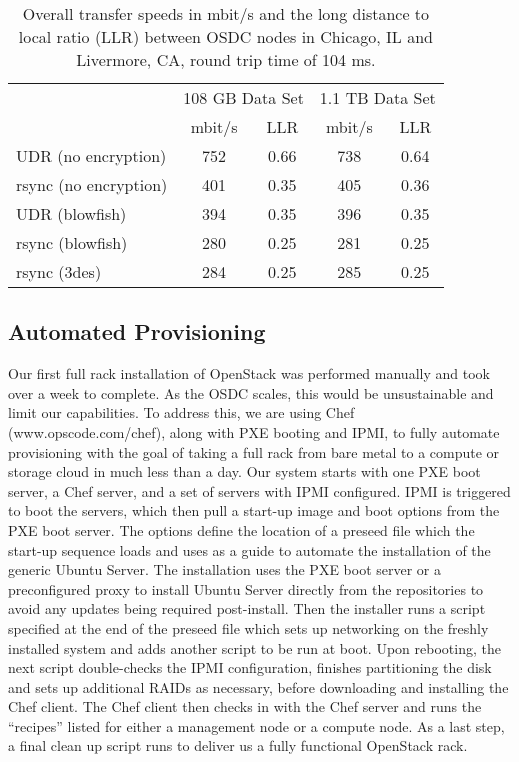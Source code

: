 \documentclass[11pt,twocolumn]{article}
\begin{document}
\begin{table*}[!ht]\renewcommand{\arraystretch}{1.1}
\centering
\begin{tabular}{l | c c c c |}
  \cline{2-5}
  & \multicolumn{2}{|c|}{108 GB Data Set} & \multicolumn{2}{c|}{1.1 TB Data Set} \\ 
  \cline{2-5}
  & mbit/s & LLR & mbit/s & LLR\\ \hline
  \multicolumn{1}{|l|}{UDR (no encryption)} & 752 & 0.66 & 738 & 0.64\\
  \multicolumn{1}{|l|}{rsync (no encryption)} & 401 & 0.35 & 405 & 0.36\\ \hline
  \multicolumn{1}{|l|}{UDR (blowfish)} & 394 & 0.35 & 396 & 0.35 \\ 
  \multicolumn{1}{|l|}{rsync (blowfish)} & 280 & 0.25 & 281 & 0.25\\ \hline
  \multicolumn{1}{|l|}{rsync (3des)} & 284 & 0.25 & 285 & 0.25\\ \hline
\end{tabular}
\caption{Overall transfer speeds in mbit/s and the long distance to local ratio (LLR) between OSDC nodes in Chicago, IL and Livermore, CA, round trip time of 104 ms.}
\label{tbl:speeds}
\end{table*}

\subsection{Automated Provisioning}
Our first full rack installation of OpenStack was performed manually
and took over a week to complete. As the OSDC scales, this would be
unsustainable and limit our capabilities. To address this, we are
using Chef (www.opscode.com/chef), along with PXE booting and IPMI, to
fully automate provisioning with the goal of taking a full rack from
bare metal to a compute or storage cloud in much less than a day. Our
system starts with one PXE boot server, a Chef server, and a set of
servers with IPMI configured. IPMI is triggered to boot the servers,
which then pull a start-up image and boot options from the PXE boot
server. The options define the location of a preseed file which the
start-up sequence loads and uses as a guide to automate the
installation of the generic Ubuntu Server. The installation uses the
PXE boot server or a preconfigured proxy to install Ubuntu Server
directly from the repositories to avoid any updates being required
post-install. Then the installer runs a script specified at the end of
the preseed file which sets up networking on the freshly installed
system and adds another script to be run at boot. Upon rebooting, the
next script double-checks the IPMI configuration, finishes
partitioning the disk and sets up additional RAIDs as necessary,
before downloading and installing the Chef client. The Chef client
then checks in with the Chef server and runs the ``recipes'' listed
for either a management node or a compute node. As a last step, a
final clean up script runs to deliver us a fully functional OpenStack
rack.
\end{document}
